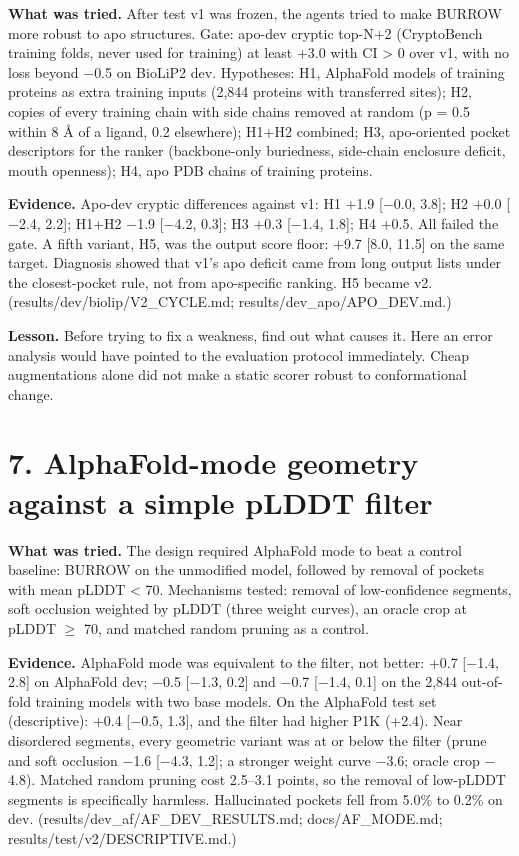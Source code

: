 \documentclass[10pt,letterpaper]{article}
\begin{document}
\textbf{What was tried.} After test v1 was frozen, the agents tried to make BURROW more robust to apo structures. Gate: apo-dev cryptic top-N+2 (CryptoBench training folds, never used for training) at least +3.0 with CI \textgreater{} 0 over v1, with no loss beyond $-$0.5 on BioLiP2 dev. Hypotheses: H1, AlphaFold models of training proteins as extra training inputs (2,844 proteins with transferred sites); H2, copies of every training chain with side chains removed at random (p = 0.5 within 8 \AA{} of a ligand, 0.2 elsewhere); H1+H2 combined; H3, apo-oriented pocket descriptors for the ranker (backbone-only buriedness, side-chain enclosure deficit, mouth openness); H4, apo PDB chains of training proteins.

\textbf{Evidence.} Apo-dev cryptic differences against v1: H1 +1.9 [$-$0.0, 3.8]; H2 +0.0 [$-$2.4, 2.2]; H1+H2 $-$1.9 [$-$4.2, 0.3]; H3 +0.3 [$-$1.4, 1.8]; H4 +0.5. All failed the gate. A fifth variant, H5, was the output score floor: +9.7 [8.0, 11.5] on the same target. Diagnosis showed that v1's apo deficit came from long output lists under the closest-pocket rule, not from apo-specific ranking. H5 became v2. (results/dev/biolip/V2\_CYCLE.md; results/dev\_apo/APO\_DEV.md.)

\textbf{Lesson.} Before trying to fix a weakness, find out what causes it. Here an error analysis would have pointed to the evaluation protocol immediately. Cheap augmentations alone did not make a static scorer robust to conformational change.

\section*{7. AlphaFold-mode geometry against a simple pLDDT filter}

\textbf{What was tried.} The design required AlphaFold mode to beat a control baseline: BURROW on the unmodified model, followed by removal of pockets with mean pLDDT \textless{} 70. Mechanisms tested: removal of low-confidence segments, soft occlusion weighted by pLDDT (three weight curves), an oracle crop at pLDDT $\ge$ 70, and matched random pruning as a control.

\textbf{Evidence.} AlphaFold mode was equivalent to the filter, not better: +0.7 [$-$1.4, 2.8] on AlphaFold dev; $-$0.5 [$-$1.3, 0.2] and $-$0.7 [$-$1.4, 0.1] on the 2,844 out-of-fold training models with two base models. On the AlphaFold test set (descriptive): +0.4 [$-$0.5, 1.3], and the filter had higher P1K (+2.4). Near disordered segments, every geometric variant was at or below the filter (prune and soft occlusion $-$1.6 [$-$4.3, 1.2]; a stronger weight curve $-$3.6; oracle crop $-$4.8). Matched random pruning cost 2.5--3.1 points, so the removal of low-pLDDT segments is specifically harmless. Hallucinated pockets fell from 5.0\% to 0.2\% on dev. (results/dev\_af/AF\_DEV\_RESULTS.md; docs/AF\_MODE.md; results/test/v2/DESCRIPTIVE.md.)
\end{document}
